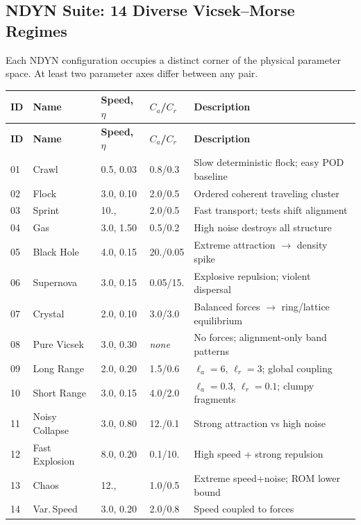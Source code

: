 \documentclass[11pt]{article}
\begin{document}
\subsection{NDYN Suite: 14 Diverse Vicsek--Morse Regimes}

Each NDYN configuration occupies a distinct corner of the physical
parameter space.  At least two parameter axes differ between any pair.

\begin{longtable}{llp{1.5cm}p{1.0cm}p{5.5cm}}
    \toprule
    \textbf{ID} & \textbf{Name} & \textbf{Speed, $\eta$} & \textbf{$C_a$/$C_r$} & \textbf{Description} \\
    \midrule
    \endfirsthead
    \toprule
    \textbf{ID} & \textbf{Name} & \textbf{Speed, $\eta$} & \textbf{$C_a$/$C_r$} & \textbf{Description} \\
    \midrule
    \endhead

    01 & Crawl        & 0.5, 0.03 & 0.8/0.3 & Slow deterministic flock; easy POD baseline \\
    02 & Flock        & 3.0, 0.10 & 2.0/0.5 & Ordered coherent traveling cluster \\
    03 & Sprint       & 10.,\;0.10 & 2.0/0.5 & Fast transport; tests shift alignment \\
    04 & Gas          & 3.0, 1.50 & 0.5/0.2 & High noise destroys all structure \\
    05 & Black Hole   & 4.0, 0.15 & 20./0.05 & Extreme attraction $\to$ density spike \\
    06 & Supernova    & 3.0, 0.15 & 0.05/15. & Explosive repulsion; violent dispersal \\
    07 & Crystal      & 2.0, 0.10 & 3.0/3.0 & Balanced forces $\to$ ring/lattice equilibrium \\
    08 & Pure Vicsek  & 3.0, 0.30 & \emph{none} & No forces; alignment-only band patterns \\
    09 & Long Range   & 2.0, 0.20 & 1.5/0.6 & $\ell_a{=}6$, $\ell_r{=}3$; global coupling \\
    10 & Short Range  & 3.0, 0.15 & 4.0/2.0 & $\ell_a{=}0.3$, $\ell_r{=}0.1$; clumpy fragments \\
    11 & Noisy Collapse & 3.0, 0.80 & 12./0.1 & Strong attraction vs high noise \\
    12 & Fast Explosion & 8.0, 0.20 & 0.1/10. & High speed + strong repulsion \\
    13 & Chaos        & 12.,\;1.20 & 1.0/0.5 & Extreme speed+noise; ROM lower bound \\
    14 & Var.\,Speed  & 3.0, 0.20 & 2.0/0.8 & Speed coupled to forces \\
    \bottomrule
\end{longtable}
\end{document}
